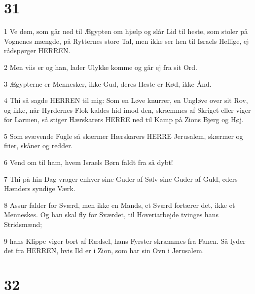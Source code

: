 \chapter{31}

\par 1 Ve dem, som går ned til Ægypten om hjælp og slår Lid til heste, som stoler på Vognenes mængde, på Rytternes store Tal, men ikke ser hen til Israels Hellige, ej rådspørger HERREN.
\par 2 Men viis er og han, lader Ulykke komme og går ej fra sit Ord.
\par 3 Ægypterne er Mennesker, ikke Gud, deres Heste er Kød, ikke Ånd.
\par 4 Thi så sagde HERREN til mig: Som en Løve knurrer, en Ungløve over sit Rov, og ikke, når Hyrdernes Flok kaldes hid imod den, skræmmes af Skriget eller viger for Larmen, så stiger Hærskarers HERRE ned til Kamp på Zions Bjerg og Høj.
\par 5 Som svævende Fugle så skærmer Hærskarers HERRE Jerusalem, skærmer og frier, skåner og redder.
\par 6 Vend om til ham, hvem Israels Børn faldt fra så dybt!
\par 7 Thi på hin Dag vrager enhver sine Guder af Sølv sine Guder af Guld, eders Hænders syndige Værk.
\par 8 Assur falder for Sværd, men ikke en Mands, et Sværd fortærer det, ikke et Menneskes. Og han skal fly for Sværdet, til Hoveriarbejde tvinges hans Stridsmænd;
\par 9 hans Klippe viger bort af Rædsel, hans Fyrster skræmmes fra Fanen. Så lyder det fra HERREN, hvis Ild er i Zion, som har sin Ovn i Jerusalem.

\chapter{32}

